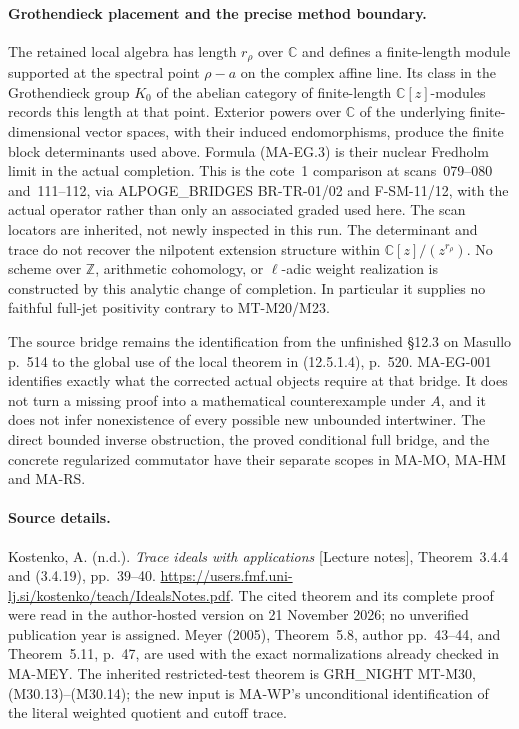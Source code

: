 \paragraph{Grothendieck placement and the precise method boundary.}
The retained local algebra has length $r_\rho$ over
$\mathbb C$ and defines a finite-length module supported at the
spectral point $\rho-a$ on the complex affine line. Its class in
the Grothendieck group $K_0$ of the abelian category of finite-length
$\mathbb C[z]$-modules records this length at that point.
Exterior powers over $\mathbb C$ of the underlying finite-dimensional
vector spaces, with their induced endomorphisms, produce the finite
block determinants used above. Formula (MA-EG.3) is their nuclear
Fredholm limit in the actual completion. This is the cote~1
comparison at scans~079--080 and~111--112, via
ALPOGE\_BRIDGES BR-TR-01/02 and F-SM-11/12, with the actual
operator rather than only an associated graded used here.
The scan locators are inherited, not newly inspected in this run.
The determinant and trace do not recover the nilpotent extension
structure within $\mathbb C[z]/(z^{r_\rho})$.
No scheme over $\mathbb Z$, arithmetic cohomology, or
$\ell$-adic weight realization is constructed by this analytic
change of completion. In particular it supplies no faithful
full-jet positivity contrary to MT-M20/M23.

The source bridge remains the identification from the unfinished
\S12.3 on Masullo p.~514 to the global use of the local theorem
in (12.5.1.4), p.~520. MA-EG-001 identifies exactly what the
corrected actual objects require at that bridge. It does not
turn a missing proof into a mathematical counterexample under
$A$, and it does not infer nonexistence of every possible new
unbounded intertwiner. The direct bounded inverse obstruction,
the proved conditional full bridge, and the concrete regularized
commutator have their separate scopes in MA-MO, MA-HM and MA-RS.

\paragraph{Source details.}
Kostenko, A. (n.d.). \emph{Trace ideals with applications}
[Lecture notes], Theorem~3.4.4 and (3.4.19), pp.~39--40.
\url{https://users.fmf.uni-lj.si/kostenko/teach/IdealsNotes.pdf}.
The cited theorem and its complete proof were read in the
author-hosted version on 21 November 2026; no unverified publication
year is assigned. Meyer (2005), Theorem~5.8, author pp.~43--44,
and Theorem~5.11, p.~47, are used with the exact normalizations
already checked in MA-MEY. The inherited restricted-test theorem
is GRH\_NIGHT MT-M30, (M30.13)--(M30.14); the new input is
MA-WP's unconditional identification of the literal weighted
quotient and cutoff trace.
